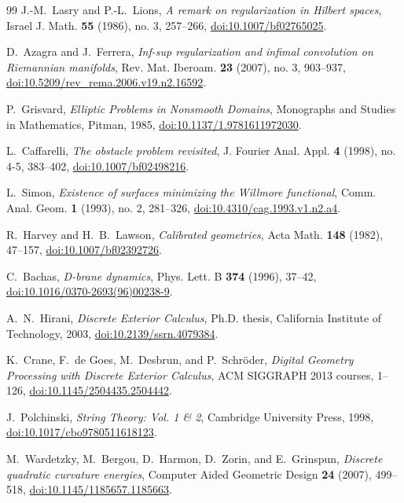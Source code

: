 \documentclass[11pt,reqno]{amsart}
\theoremstyle{definition}
\numberwithin{equation}{section}
\begin{document}
\begin{thebibliography}{99}
J.-M.~Lasry and P.-L.~Lions,
\emph{A remark on regularization in Hilbert spaces},
Israel J. Math. \textbf{55} (1986), no. 3, 257--266, \href{https://doi.org/10.1007/bf02765025}{doi:10.1007/bf02765025}.

D.~Azagra and J.~Ferrera,
\emph{Inf-sup regularization and infimal convolution on Riemannian manifolds},
Rev. Mat. Iberoam. \textbf{23} (2007), no. 3, 903--937, \href{https://doi.org/10.5209/rev_rema.2006.v19.n2.16592}{doi:10.5209/rev\_rema.2006.v19.n2.16592}.

P.~Grisvard,
\emph{Elliptic Problems in Nonsmooth Domains},
Monographs and Studies in Mathematics, Pitman, 1985, \href{https://doi.org/10.1137/1.9781611972030}{doi:10.1137/1.9781611972030}.

L.~Caffarelli,
\emph{The obstacle problem revisited},
J. Fourier Anal. Appl. \textbf{4} (1998), no. 4-5, 383--402, \href{https://doi.org/10.1007/bf02498216}{doi:10.1007/bf02498216}.

L.~Simon,
\emph{Existence of surfaces minimizing the Willmore functional},
Comm. Anal. Geom. \textbf{1} (1993), no. 2, 281--326, \href{https://doi.org/10.4310/cag.1993.v1.n2.a4}{doi:10.4310/cag.1993.v1.n2.a4}.

R.~Harvey and H.~B.~Lawson,
\emph{Calibrated geometries},
Acta Math. \textbf{148} (1982), 47--157, \href{https://doi.org/10.1007/bf02392726}{doi:10.1007/bf02392726}.

C.~Bachas,
\emph{D-brane dynamics},
Phys. Lett. B \textbf{374} (1996), 37--42, \href{https://doi.org/10.1016/0370-2693(96)00238-9}{doi:10.1016/0370-2693(96)00238-9}.

A.~N.~Hirani,
\emph{Discrete Exterior Calculus},
Ph.D. thesis, California Institute of Technology, 2003, \href{https://doi.org/10.2139/ssrn.4079384}{doi:10.2139/ssrn.4079384}.

K.~Crane, F.~de Goes, M.~Desbrun, and P.~Schr{\"o}der,
\emph{Digital Geometry Processing with Discrete Exterior Calculus},
ACM SIGGRAPH 2013 courses, 1--126, \href{https://doi.org/10.1145/2504435.2504442}{doi:10.1145/2504435.2504442}.

J.~Polchinski,
\emph{String Theory: Vol. 1 \& 2},
Cambridge University Press, 1998, \href{https://doi.org/10.1017/cbo9780511618123}{doi:10.1017/cbo9780511618123}.

M.~Wardetzky, M.~Bergou, D.~Harmon, D.~Zorin, and E.~Grinspun,
\emph{Discrete quadratic curvature energies},
Computer Aided Geometric Design \textbf{24} (2007), 499--518, \href{https://doi.org/10.1145/1185657.1185663}{doi:10.1145/1185657.1185663}.

\end{thebibliography}
\end{document}

